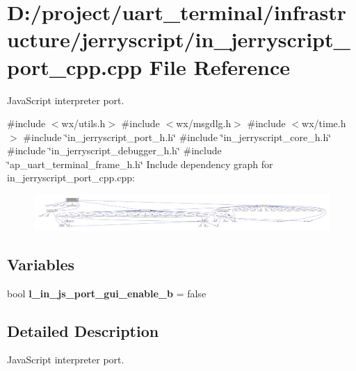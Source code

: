 \section{D\+:/project/uart\+\_\+terminal/infrastructure/jerryscript/in\+\_\+jerryscript\+\_\+port\+\_\+cpp.cpp File Reference}
\label{in__jerryscript__port__cpp_8cpp}


Java\+Script interpreter port.  


{\ttfamily \#include $<$wx/utils.\+h$>$}\newline
{\ttfamily \#include $<$wx/msgdlg.\+h$>$}\newline
{\ttfamily \#include $<$wx/time.\+h$>$}\newline
{\ttfamily \#include \char`\"{}in\+\_\+jerryscript\+\_\+port\+\_\+h.\+h\char`\"{}}\newline
{\ttfamily \#include \char`\"{}in\+\_\+jerryscript\+\_\+core\+\_\+h.\+h\char`\"{}}\newline
{\ttfamily \#include \char`\"{}in\+\_\+jerryscript\+\_\+debugger\+\_\+h.\+h\char`\"{}}\newline
{\ttfamily \#include \char`\"{}ap\+\_\+uart\+\_\+terminal\+\_\+frame\+\_\+h.\+h\char`\"{}}\newline
Include dependency graph for in\+\_\+jerryscript\+\_\+port\+\_\+cpp.\+cpp\+:
\nopagebreak
\begin{figure}[H]
\begin{center}
\leavevmode
\includegraphics[width=350pt]{in__jerryscript__port__cpp_8cpp__incl}
\end{center}
\end{figure}
\subsection*{Variables}
\begin{DoxyCompactItemize}
\item 
bool \textbf{ l\+\_\+in\+\_\+js\+\_\+port\+\_\+gui\+\_\+enable\+\_\+b} = false
\end{DoxyCompactItemize}


\subsection{Detailed Description}
Java\+Script interpreter port. 

